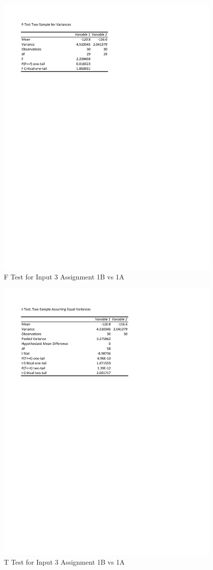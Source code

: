 \documentclass[times]{article}
\begin{document}
	\begin{figure}
		\caption{F Test for Input 3 Assignment 1B vs 1A}
		\label{fig:f_test3}
		\includegraphics[width=\textwidth]{./tests/Input3_f_test.pdf}
	\end{figure}

	\begin{figure}
		\caption{T Test for Input 3 Assignment 1B vs 1A}
		\label{fig:t_test3}
		\includegraphics[width=\textwidth]{./tests/Input3_t_test.pdf}
	\end{figure}
		
\end{document}
